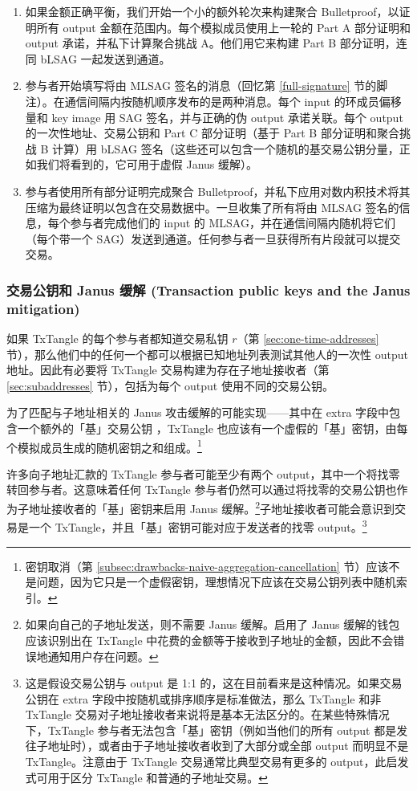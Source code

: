 \begin{enumerate}
    \item 如果金额正确平衡，我们开始一个小的额外轮次来构建聚合 Bulletproof，以证明所有 output 金额在范围内。每个模拟成员使用上一轮的 Part A 部分证明和 output 承诺，并私下计算聚合挑战 A。他们用它来构建 Part B 部分证明，连同 bLSAG 一起发送到通道。

    \item 参与者开始填写将由 MLSAG 签名的消息（回忆第 \ref{full-signature} 节的脚注）。在通信间隔内按随机顺序发布的是两种消息。每个 input 的环成员偏移量和 key image 用 SAG 签名，并与正确的伪 output 承诺关联。每个 output 的一次性地址、交易公钥和 Part C 部分证明（基于 Part B 部分证明和聚合挑战 B 计算）用 bLSAG 签名（这些还可以包含一个随机的基交易公钥分量，正如我们将看到的，它可用于虚假 Janus 缓解）。

    \item 参与者使用所有部分证明完成聚合 Bulletproof，并私下应用对数内积技术将其压缩为最终证明以包含在交易数据中。一旦收集了所有将由 MLSAG 签名的信息，每个参与者完成他们的 input 的 MLSAG，并在通信间隔内随机将它们（每个带一个 SAG）发送到通道。任何参与者一旦获得所有片段就可以提交交易。
\end{enumerate}{}

\subsubsection*{交易公钥和 Janus 缓解 (Transaction public keys and the Janus mitigation)}

如果 TxTangle 的每个参与者都知道交易私钥 $r$（第 \ref{sec:one-time-addresses} 节），那么他们中的任何一个都可以根据已知地址列表测试其他人的一次性 output 地址。因此有必要将 TxTangle 交易构建为存在子地址接收者（第 \ref{sec:subaddresses} 节），包括为每个 output 使用不同的交易公钥。

为了匹配与子地址相关的 Janus 攻击缓解的可能实现——其中在 extra 字段中包含一个额外的「基」交易公钥 \cite{janus-mitigation-issue-62}，TxTangle 也应该有一个虚假的「基」密钥，由每个模拟成员生成的随机密钥之和组成。\footnote{密钥取消（第 \ref{subsec:drawbacks-naive-aggregation-cancellation} 节）应该不是问题，因为它只是一个虚假密钥，理想情况下应该在交易公钥列表中随机索引。}

许多向子地址汇款的 TxTangle 参与者可能至少有两个 output，其中一个将找零转回参与者。这意味着任何 TxTangle 参与者仍然可以通过将找零的交易公钥也作为子地址接收者的「基」密钥来启用 Janus 缓解。\footnote{如果向自己的子地址发送，则不需要 Janus 缓解。启用了 Janus 缓解的钱包应该识别出在 TxTangle 中花费的金额等于接收到子地址的金额，因此不会错误地通知用户存在问题。}子地址接收者可能会意识到交易是一个 TxTangle，并且「基」密钥可能对应于发送者的找零 output。\footnote{这是假设交易公钥与 output 是 1:1 的，这在目前看来是这种情况。如果交易公钥在 extra 字段中按随机或排序顺序是标准做法，那么 TxTangle 和非 TxTangle 交易对子地址接收者来说将是基本无法区分的。在某些特殊情况下，TxTangle 参与者无法包含「基」密钥（例如当他们的所有 output 都是发往子地址时），或者由于子地址接收者收到了大部分或全部 output 而明显不是 TxTangle。注意由于 TxTangle 交易通常比典型交易有更多的 output，此启发式可用于区分 TxTangle 和普通的子地址交易。}


